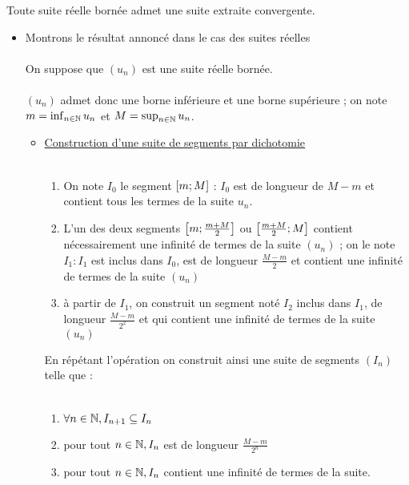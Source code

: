 \begin{theo}
    Toute suite réelle bornée admet une suite extraite convergente.
\end{theo}
\begin{dem}
    \begin{itemize}
        \item Montrons le résultat annoncé dans le cas des suites réelles\\~\\
        On suppose que \((u_n)\) est une suite réelle bornée.\\~\\
        \((u_n)\) admet donc une borne inférieure et une borne supérieure ; on note \(m = \inf_{n \in \mathbb{N}} u_n\) et \(M = \sup_{n \in \mathbb{N}}u_n\).
        \begin{itemize}
            \item \underline{Construction d'une suite de segments par dichotomie}\\~\\
            \begin{enumerate}
                \item On note \(I_0\) le segment \(\left[m;M\right]\) : \(I_0\) est de longueur de \(M-m\) et contient tous les termes de la suite \(u_n\).
                \item L'un des deux segments \(\left[m;\frac{m+M}{2}\right]\) ou \(\left[\frac{m+M}{2};M\right]\) contient nécessairement une infinité de termes de la suite \((u_n)\) ; on le note \(I_1 :I_1\) est inclus dans \(I_0\), est de longueur \(\frac{M-m}{2}\) et contient une infinité de termes de la suite \((u_n)\)
                \item à partir de \(I_1\), on construit un segment noté \(I_2\) inclus dans \(I_1\), de longueur \(\frac{M-m}{2^2}\) et qui contient une infinité de termes de la suite \((u_n)\)
            \end{enumerate}
            En répétant l'opération on construit ainsi une suite de segments \((I_n)\) telle que : \\~\\
            \begin{enumerate}
                \item \(\forall n \in \mathbb{N},I_{n+1}\subseteq I_n\)
                \item pour tout \(n \in \mathbb{N}, I_n\) est de longueur \(\frac{M-m}{2^n}\)
                \item pour tout \(n \in \mathbb{N},I_n\) contient une infinité de termes de la suite.

\end{enumerate}
\end{itemize}
\end{itemize}
\end{dem}
